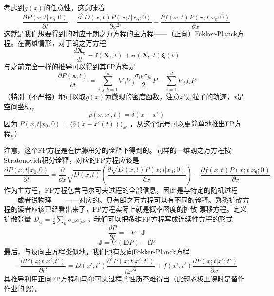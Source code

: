 \documentclass{ctexart}
\begin{document}
考虑到$g(x)$的任意性，这意味着
\begin{equation}
\frac{\partial P(x;t|x_0,0)}{\partial t}=\frac{\partial^2D(x,t)P(x;t|x_0;0)}{\partial x^2}-\frac{\partial f(x,t)P(x;t|x_0;0)}{\partial x}
\end{equation}
这就是我们想要得到的对应于朗之万方程的主方程——（正向）Fokker-Planck方程。在高维情形，对于朗之万方程
\begin{equation}
\frac{d \bm{X_t}}{dt}=\bm{f}(\bm{X}_t,t)+\bm{\sigma}(\bm{X}_t,t)\bm{\xi}(t)
\end{equation}
与之前完全一样的推导可以得到其FP方程是
\begin{equation}
\frac{\partial P(\bm{x};t)}{\partial t}=\sum_{i,j,k=1}^d\nabla_i\nabla_j\frac{\sigma_{ik}\sigma_{jk}}{2}P-\sum_{i=1}^d \nabla_if_iP
\end{equation}
（特别（不严格）地可以取$g(x)$为微观的密度函数，注意$x'$是粒子的轨迹，$x$是空间坐标，
\begin{equation}
\hat\rho(x,x',t)=\delta(x-x')
\end{equation}
因为 $P(x,t|x_0,0)=\langle\hat{\rho}(x-x'(t))\rangle_{x'}$ ，从这个记号可以更简单地推出FP方程。）

注意，这个FP方程是在伊藤积分的诠释下得到的。同样的一维朗之万方程按Stratonovich积分诠释，对应的FP方程应该是
\begin{equation}
\frac{\partial P(x;t|x_0,0)}{\partial t}=\frac{\partial}{\partial x}\sqrt{D(x,t)}\left(\frac{\partial\sqrt{D(x,t)}P(x;t|x_0;0)}{\partial x}\right)-\frac{\partial f(x,t)P(x;t|x_0;0)}{\partial x}
\end{equation}
作为主方程，FP方程包含马尔可夫过程的全部信息，因此是与特定的随机过程——或者说物理——一一对应的。只有朗之万方程可以有不同的诠释。熟悉扩散方程的读者应该已经看出来了，FP方程实际上就是概率密度的扩散-漂移方程。定义扩散张量 $D_{ij}=\frac{1}{2}\sum_k\sigma_{ik}\sigma_{jk}$ ，我们可以把多维FP方程写成连续性方程的形式
\begin{equation}
\frac{\partial P}{\partial t}=-\nabla\cdot\bm{J}
\end{equation}
\begin{equation}
\bm{J}=\nabla(\bm{D}P)-\bm{f}P
\end{equation}
最后，与反向主方程类似地，我们也有反向Fokker-Planck方程
\begin{equation}
-\frac{\partial P(x;t|x',t')}{\partial t'}=D(x',t')\frac{\partial^2P(x;t|x';t')}{\partial x'^2}+f(x',t')\frac{\partial P(x;t|x';t')}{\partial x'}
\end{equation}
其推导利用正向FP方程和马尔可夫过程的性质不难得出（此题老板上课时是留作作业的嗯）。
\end{document}
